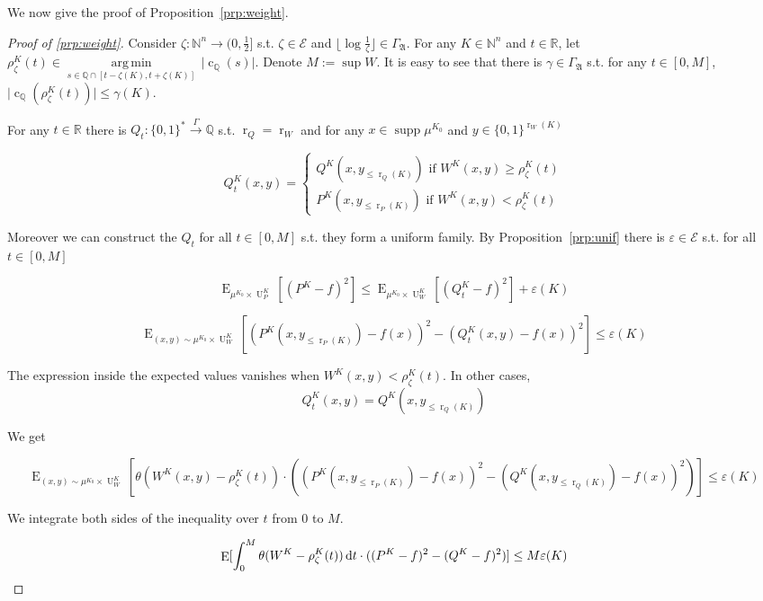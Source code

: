 \documentclass{article}
\numberwithin{equation}{section}
\theoremstyle{definition}
\theoremstyle{plain}
\newcommand{\Bool}{\{0,1\}}
\newcommand{\Words}{{\Bool^*}}
\newcommand{\WordsLen}[1]{{\Bool^{#1}}}
\DeclareMathOperator{\Supp}{supp}
\DeclareMathOperator{\E}{E}
\DeclareMathOperator{\R}{r}
\DeclareMathOperator{\Un}{U}
\DeclareMathOperator{\En}{c}
\newcommand{\Argmin}[1]{\underset{#1}{\operatorname{arg\,min}}\,}
\newcommand{\Nats}{\mathbb{N}}
\newcommand{\Rats}{\mathbb{Q}}
\newcommand{\Reals}{\mathbb{R}}
\newcommand{\Abs}[1]{\lvert #1 \rvert}
\newcommand{\Floor}[1]{\lfloor #1 \rfloor}
\newcommand{\GrowA}{\Gamma_{\mathfrak{A}}}
\newcommand{\Fall}{\mathcal{E}}
\newcommand{\Scheme}{\xrightarrow{\Gamma}}
\begin{document}
We now give the proof of Proposition~\ref{prp:weight}.

\begin{proof}[Proof of \ref{prp:weight}]

Consider $\zeta: \Nats^n \rightarrow (0,\frac{1}{2}]$ s.t.  $\zeta \in \Fall$ and $\Floor{\log \frac{1}{\zeta}} \in \GrowA$. For any $K \in \Nats^n$ and $t \in \Reals$, let $\rho_\zeta^{K}(t) \in \Argmin{s \in \Rats \cap [t-\zeta(K),t+\zeta(K)]} \Abs{\En_\Rats(s)}$. Denote $M:= \sup W$. It is easy to see that there is $\gamma \in \GrowA$ s.t. for any $t \in [0, M]$, ${\Abs{\En_\Rats(\rho_\zeta^{K}(t))} \leq \gamma(K)}$.

For any $t \in \Reals$ there is $Q_t: \Words \Scheme \Rats$ s.t. $\R_Q=\R_W$ and for any ${x \in \Supp \mu^{K_0}}$ and ${y \in \WordsLen{\R_W(K)}}$

$$Q_t^{K}(x,y)=\begin{cases}Q^{K}(x,y_{\leq \R_Q(K)}) \text{ if } W^{K}(x,y) \geq \rho^{K}_\zeta(t) \\ P^{K}(x,y_{\leq \R_P(K)}) \text{ if } W^{K}(x,y) < \rho^{K}_\zeta(t)\end{cases}$$

Moreover we can construct the $Q_t$ for all $t \in [0, M]$ s.t. they form a uniform family. By Proposition~\ref{prp:unif} there is $\varepsilon \in \Fall$ s.t. for all $t \in [0, M]$

$$\E_{\mu^{K_0} \times \Un_P^{K}}[(P^{K}-f)^2] \leq \E_{\mu^{K_0} \times \Un_W^{K}}[(Q_t^{K}-f)^2] + \varepsilon(K)$$

$$\E_{(x,y) \sim \mu^{K_0} \times \Un_W^{K}}[(P^{K}(x,y_{\leq \R_P(K)})-f(x))^2-(Q_t^{K}(x,y)-f(x))^2] \leq \varepsilon(K)$$

The expression inside the expected values vanishes when $W^{K}(x,y) < \rho^{K}_\zeta(t)$. In other cases, 
\[Q_t^{K}(x,y) = Q^{K}(x,y_{\leq \R_Q(K)})\]

We get

$$\E_{(x,y) \sim \mu^{K_0} \times \Un_W^{K}}[\theta(W^{K}(x,y)-\rho_\zeta^{K}(t)) \cdot ((P^{K}(x,y_{\leq \R_P(K)})-f(x))^2-(Q^{K}(x,y_{\leq \R_Q(K)})-f(x))^2)] \leq \varepsilon(K)$$

We integrate both sides of the inequality over $t$ from 0 to $M$.

\begin{equation}
\label{eqn:prp__weight__prf1}
\E[\int_0^M\theta(W^{K}-\rho_\zeta^{K}(t)) \dif t \cdot ((P^{K}-f)^2-(Q^{K}-f)^2)] \leq M \varepsilon(K)
\end{equation}


\end{proof}
\end{document}
